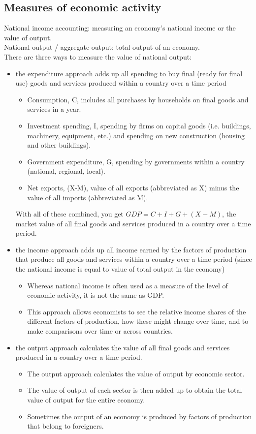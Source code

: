 \subsection{Measures of economic activity}
National income accounting: measuring an economy's national income or the value of output.\\
National output / aggregate output: total output of an economy.\\
There are three ways to measure the value of national output:
\begin{itemize}
  \item the expenditure approach adds up all spending to buy final (ready for final use) goods and services produced within a country over a time period
  \begin{itemize}
    \item Consumption, C, includes all purchases by households on final goods and services in a year.
    \item Investment spending, I, spending by firms on capital goods (i.e. buildings, machinery, equipment, etc.) and spending on new construction (housing and other buildings).
    \item Government expenditure, G, spending by governments within a country (national, regional, local).
    \item Net exports, (X-M), value of all exports (abbreviated as X) minus the value of all imports (abbreviated as M).
  \end{itemize}
  With all of these combined, you get $GDP=C+I+G+(X-M)$, the market value of all final goods and services produced in a country over a time period.
  \item the income approach adds up all income earned by the factors of production that produce all goods and services within a country over a time period (since the national income is equal to value of total output in the economy)
  \begin{itemize}
    \item Whereas national income is often used as a measure of the level of economic activity, it is not the same as GDP. 
    \item This approach allows economists to see the relative income shares of the different factors of production, how these might change over time, and to make comparisons over time or across countries.
  \end{itemize}
  \item the output approach calculates the value of all final goods and services produced in a country over a time period.
  \begin{itemize}
    \item The output approach calculates the value of output by economic sector.
    \item The value of output of each sector is then added up to obtain the total value of output for the entire economy.
    \item Sometimes the output of an economy is produced by factors of production that belong to foreigners.
  \end{itemize}
\end{itemize}
